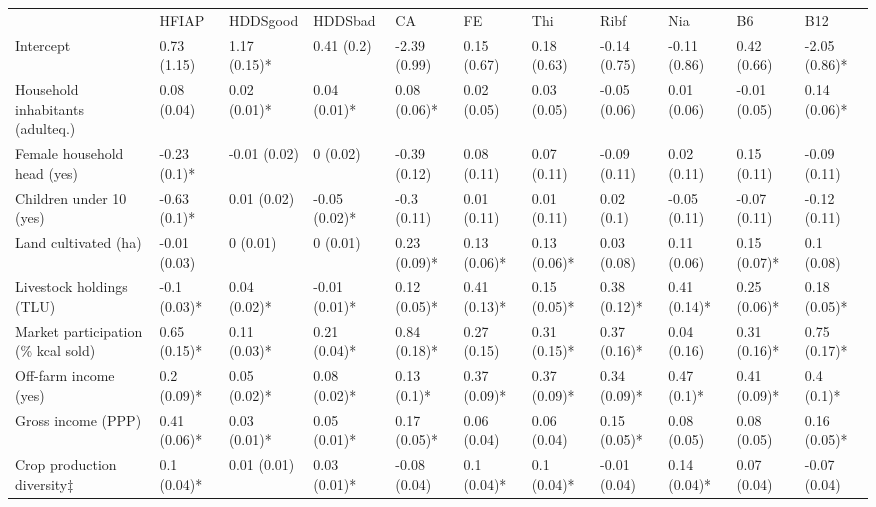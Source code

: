 \documentclass{scrbook}
\begin{document}
\begin{table}
\begin{tabularx}{\textwidth}{
p{}
p{}
p{}
p{}
p{}
p{}
p{}
p{}
p{}
p{}
p{}}
 & HFIAP & HDDSgood & HDDSbad & CA & FE & Thi & Ribf & Nia & B6 & B12 \\
Intercept & 0.73 (1.15) & 1.17 (0.15)* & 0.41 (0.2) & -2.39 (0.99) & 0.15 (0.67) & 0.18 (0.63) & -0.14 (0.75) & -0.11 (0.86) & 0.42 (0.66) & -2.05 (0.86)* \\
Household inhabitants (adulteq.) & 0.08 (0.04) & 0.02 (0.01)* & 0.04 (0.01)* & 0.08 (0.06)* & 0.02 (0.05) & 0.03 (0.05) & -0.05 (0.06) & 0.01 (0.06) & -0.01 (0.05) & 0.14 (0.06)* \\
Female household head (yes) & -0.23 (0.1)* & -0.01 (0.02) & 0 (0.02) & -0.39 (0.12) & 0.08 (0.11) & 0.07 (0.11) & -0.09 (0.11) & 0.02 (0.11) & 0.15 (0.11) & -0.09 (0.11) \\
Children under 10 (yes) & -0.63 (0.1)* & 0.01 (0.02) & -0.05 (0.02)* & -0.3 (0.11) & 0.01 (0.11) & 0.01 (0.11) & 0.02 (0.1) & -0.05 (0.11) & -0.07 (0.11) & -0.12 (0.11) \\
Land cultivated (ha) & -0.01 (0.03) & 0 (0.01) & 0 (0.01) & 0.23 (0.09)* & 0.13 (0.06)* & 0.13 (0.06)* & 0.03 (0.08) & 0.11 (0.06) & 0.15 (0.07)* & 0.1 (0.08) \\
Livestock holdings (TLU) & -0.1 (0.03)* & 0.04 (0.02)* & -0.01 (0.01)* & 0.12 (0.05)* & 0.41 (0.13)* & 0.15 (0.05)* & 0.38 (0.12)* & 0.41 (0.14)* & 0.25 (0.06)* & 0.18 (0.05)* \\
Market participation (\% kcal sold) & 0.65 (0.15)* & 0.11 (0.03)* & 0.21 (0.04)* & 0.84 (0.18)* & 0.27 (0.15) & 0.31 (0.15)* & 0.37 (0.16)* & 0.04 (0.16) & 0.31 (0.16)* & 0.75 (0.17)* \\
Off-farm income (yes) & 0.2 (0.09)* & 0.05 (0.02)* & 0.08 (0.02)* & 0.13 (0.1)* & 0.37 (0.09)* & 0.37 (0.09)* & 0.34 (0.09)* & 0.47 (0.1)* & 0.41 (0.09)* & 0.4 (0.1)* \\
Gross income (PPP) & 0.41 (0.06)* & 0.03 (0.01)* & 0.05 (0.01)* & 0.17 (0.05)* & 0.06 (0.04) & 0.06 (0.04) & 0.15 (0.05)* & 0.08 (0.05) & 0.08 (0.05) & 0.16 (0.05)* \\
Crop production diversity${\ddag}$ & 0.1 (0.04)* & 0.01 (0.01) & 0.03 (0.01)* & -0.08 (0.04) & 0.1 (0.04)* & 0.1 (0.04)* & -0.01 (0.04) & 0.14 (0.04)* & 0.07 (0.04) & -0.07 (0.04) \\

\end{tabularx}
\end{table}
\end{document}
